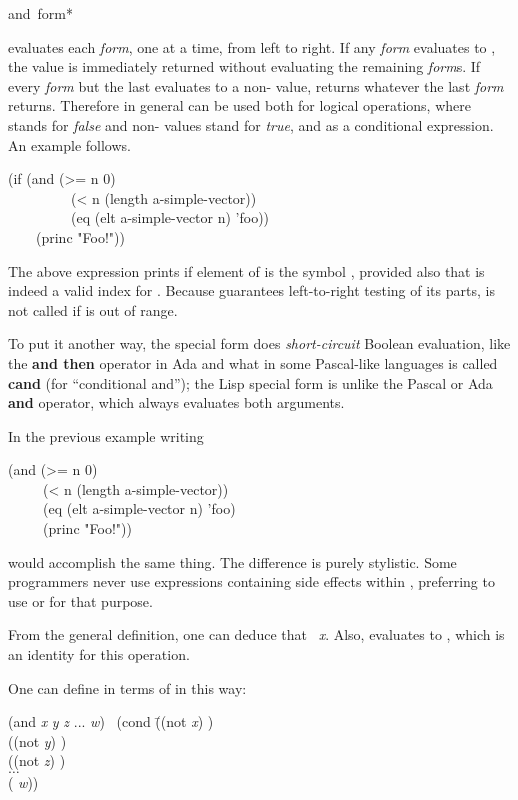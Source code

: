 \begin{defmac}
and {\,form}*

 evaluates each {\it form}, one at a time,
from left to right.  If any {\it form} evaluates to {\false}, the value {\nil}
is immediately returned without evaluating the remaining
{\it form\/}s.  If every {\it form} but the last evaluates to a non-{\false} value,
 returns whatever the last {\it form} returns.
Therefore in general  can be used both for logical operations,
where {\false} stands for {\it false} and non-{\false} values stand for {\it true},
and as a conditional expression.
An example follows.
\begin{lisp}
(if (and (>= n 0) \\
~~~~~~~~~(< n (length a-simple-vector)) \\
~~~~~~~~~(eq (elt a-simple-vector n) 'foo)) \\
~~~~(princ "Foo!"))
\end{lisp}
The above expression prints  if element  of 
is the symbol , provided also that  is indeed a valid index
for .  Because  guarantees left-to-right testing
of its parts,  is not called if  is out of range.

To put it another way,
the  special form does {\it short-circuit} Boolean evaluation,
like the {\bf and then} operator in Ada
and what in some Pascal-like languages is called {\bf cand} (for ``conditional
and''); the Lisp  special form is
unlike the Pascal or Ada {\bf and} operator,
which always evaluates both arguments.

In the previous example writing
\begin{lisp}
(and (>= n 0) \\
~~~~~(< n (length a-simple-vector)) \\
~~~~~(eq (elt a-simple-vector n) 'foo) \\
~~~~~(princ "Foo!"))
\end{lisp}
would accomplish the same thing.  The difference is purely stylistic.
Some programmers never use expressions containing side effects
within , preferring to use  or  for that purpose.

From the general definition, one can deduce that
 \EQ\ {\it x}.  Also,
 evaluates to {\true}, which is an identity for this operation.

One can define  in terms of  in this way:
\begin{lisp}
(and {\it x} {\it y} {\it z} ... {\it w}) \EQ\ (cond \=((not {\it x}) {\false}) \\
\>((not {\it y}) {\false}) \\
\>((not {\it z}) {\false}) \\
\>\(\ldots\) \\
\>({\true} {\it w}))
\end{lisp}


\end{defmac}
